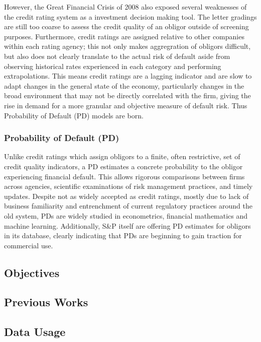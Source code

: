 \documentclass[10pt]{article}
\begin{document}
\begin{multicols*}{2}
However, the Great Financial Crisis of 2008 also exposed several weaknesses of the credit rating system as a investment decision making tool. The letter gradings are still too coarse to assess the credit quality of an obligor outside of screening purposes.
Furthermore, credit ratings are assigned relative to other companies within each rating agency; this not only makes aggregration of obligors difficult, but also does not clearly translate to the actual risk of default aside from observing historical rates experienced in each category and performing extrapolations.
This means credit ratings are a lagging indicator and are slow to adapt changes in the general state of the economy, particularly changes in the broad environment that may not be directly correlated with the firm, giving the rise in demand for a more granular and objective measure of default risk.
Thus Probability of Default (PD) models are born.
    
\subsubsection{Probability of Default (PD)}

Unlike credit ratings which assign obligors to a finite, often restrictive, set of credit quality indicators, a PD estimates a concrete probability to the obligor experiencing financial default.
This allows rigorous comparisons between firms across agencies, scientific examinations of risk management practices, and timely updates. Despite not as widely accepted as credit ratings, 
mostly due to lack of business familiarity and entrenchment of current regulatory practices around the old system, PDs are widely studied in econometrics, financial mathematics and machine learning.
Additionally, S\&P itself are offering PD estimates for obligors in its database, clearly indicating that PDs are beginning to gain traction for commercial use.

\subsection{Objectives}

\subsection{Previous Works}

\subsection{Data Usage}


\end{multicols*}
\end{document}
